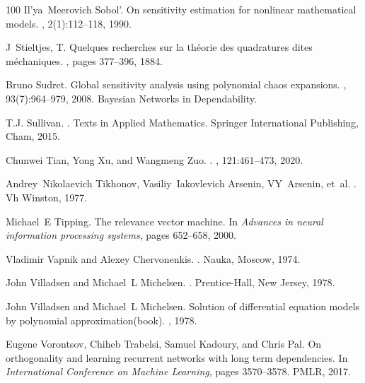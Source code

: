 \documentclass[a4paper,fleqn]{article}
\begin{document}
\begin{thebibliography}{100}
Il'ya~Meerovich Sobol'.
\newblock On sensitivity estimation for nonlinear mathematical models.
, 2(1):112--118, 1990.

J~Stieltjes, T.
\newblock Quelques recherches sur la th\'eorie des quadratures dites
  m\'echaniques.
, pages 377--396, 1884.

Bruno Sudret.
\newblock Global sensitivity analysis using polynomial chaos expansions.
, 93(7):964--979, 2008.
\newblock Bayesian Networks in Dependability.

T.J. Sullivan.
.
\newblock Texts in Applied Mathematics. Springer International Publishing,
  Cham, 2015.

Chunwei Tian, Yong Xu, and Wangmeng Zuo.
.
, 121:461--473, 2020.

Andrey~Nikolaevich Tikhonov, Vasiliy~Iakovlevich Arsenin, VY~Arsenin, et~al.
.
\newblock Vh Winston, 1977.

Michael~E Tipping.
\newblock The relevance vector machine.
\newblock In {\em Advances in neural information processing systems}, pages
  652--658, 2000.

Vladimir Vapnik and Alexey Chervonenkis.
.
\newblock Nauka, Moscow, 1974.

John Villadsen and Michael~L Michelsen.
.
\newblock Prentice-Hall, New Jersey, 1978.

John Villadsen and Michael~L Michelsen.
\newblock Solution of differential equation models by polynomial
  approximation(book).
,
  1978.

Eugene Vorontsov, Chiheb Trabelsi, Samuel Kadoury, and Chris Pal.
\newblock On orthogonality and learning recurrent networks with long term
  dependencies.
\newblock In {\em International Conference on Machine Learning}, pages
  3570--3578. PMLR, 2017.


\end{thebibliography}
\end{document}
